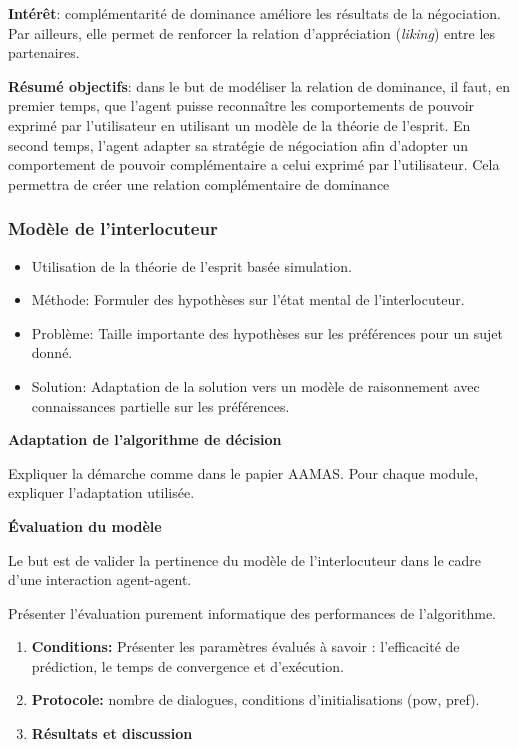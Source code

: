 {\textbf{Intérêt}: complémentarité de dominance améliore les résultats de la négociation. Par ailleurs, elle permet de renforcer la relation d'appréciation (\emph{liking}) entre les partenaires.  

\textbf{Résumé objectifs}: dans le but de modéliser la relation de dominance, il faut, en premier temps, que l'agent puisse reconnaître les comportements de pouvoir exprimé par l'utilisateur en utilisant un modèle de la théorie de l'esprit. En second temps, l'agent adapter sa stratégie de négociation afin d'adopter un comportement de pouvoir complémentaire a celui exprimé par l'utilisateur. Cela permettra de créer une relation complémentaire de dominance 

\subsubsection{Modèle de l'interlocuteur}
\begin{itemize}
	\item Utilisation de la théorie de l'esprit basée simulation. 
	\item Méthode: Formuler des hypothèses sur l'état mental de l'interlocuteur.
	\item Problème: Taille importante des hypothèses sur les préférences pour un sujet donné. 
	\item Solution: Adaptation de la solution vers un modèle de raisonnement avec connaissances partielle sur les préférences. 
\end{itemize}

\textbf{Adaptation de l'algorithme de décision}

\par Expliquer la démarche comme dans le papier AAMAS. Pour chaque module, expliquer l'adaptation utilisée.

\textbf{Évaluation du modèle}

Le but est de valider la pertinence du modèle de l'interlocuteur dans le cadre d'une interaction agent-agent. 
\par Présenter l'évaluation purement informatique des performances de l'algorithme.
\begin{enumerate}
	\item \textbf{Conditions:} Présenter les paramètres évalués à savoir : l'efficacité de prédiction, le temps de convergence et d'exécution.
	\item \textbf{Protocole:} nombre de dialogues, conditions d'initialisations (pow, pref).
	\item \textbf{Résultats et discussion}
\end{enumerate}

}
